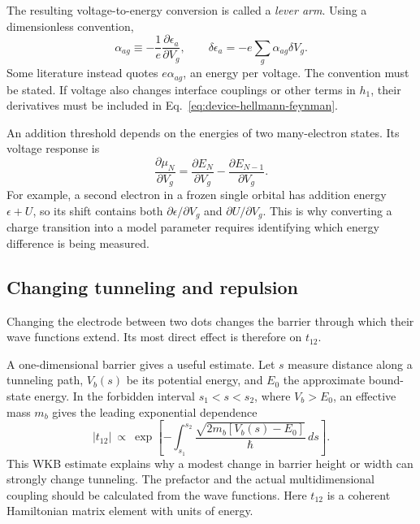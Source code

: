 The resulting voltage-to-energy conversion is called a
\emph{lever arm}. Using a dimensionless convention,
\begin{equation}
 \alpha_{ag}\equiv-\frac1e
           \frac{\partial\epsilon_a}{\partial V_g},
 \qquad
 \delta\epsilon_a=-e\sum_g\alpha_{ag}\delta V_g.
 \label{eq:device-lever-arm}
\end{equation}
Some literature instead quotes $e\alpha_{ag}$, an energy per
voltage. The convention must be stated.
If voltage also changes interface couplings or other terms in
$h_1$, their derivatives must be included in
Eq.~\eqref{eq:device-hellmann-feynman}.

An addition threshold depends on the energies of two many-electron
states. Its voltage response is
\begin{equation}
 \frac{\partial\mu_N}{\partial V_g}
    =\frac{\partial E_N}{\partial V_g}
      -\frac{\partial E_{N-1}}{\partial V_g}.
 \label{eq:device-addition-response}
\end{equation}
For example, a second electron in a frozen single orbital has
addition energy $\epsilon+U$, so its shift contains both
$\partial\epsilon/\partial V_g$ and $\partial U/\partial V_g$.
This is why converting a charge transition into a model
parameter requires identifying which energy difference is
being measured.

\subsection{Changing tunneling and repulsion}

Changing the electrode between two dots changes the barrier
through which their wave functions extend. Its most direct
effect is therefore on $t_{12}$.

A one-dimensional barrier gives a useful estimate. Let $s$
measure distance along a tunneling path, $V_b(s)$ be its potential
energy, and $E_0$ the approximate bound-state energy. In the
forbidden interval $s_1<s<s_2$, where $V_b>E_0$, an effective
mass $m_b$ gives the leading exponential dependence
\begin{equation}
 |t_{12}|\ \propto\
 \exp\!\left[-\int_{s_1}^{s_2}
       \frac{\sqrt{2m_b[V_b(s)-E_0]}}{\hbar}\,ds\right].
 \label{eq:device-wkb-hopping}
\end{equation}
This WKB estimate explains why a modest change in barrier height
or width can strongly change tunneling. The prefactor and the
actual multidimensional coupling should be calculated from the
wave functions. Here $t_{12}$ is a coherent Hamiltonian matrix
element with units of energy.

